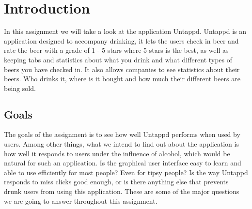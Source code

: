 \documentclass[12pt]{article}
\begin{document}
\clearpage

\setlength{\parskip}{0.2in}






\section{Introduction}


In this assignment we will take a look at the application Untappd. Untappd is an
application designed to accompany drinking, it lets the users check in beer and
rate the beer with a grade of 1 - 5 stars where 5 stars is the best, as well as
keeping tabs and statistics about what you drink and what different types of
beers you have checked in. It also allows companies to see statistics about
their beers. Who drinks it, where is it bought and how much their different
beers are being sold.

\subsection{Goals}

The goals of the assignment is to see how well Untappd performs when used by
users. Among other things, what we intend to find out about the application is
how well it responds to users under the influence of alcohol, which would be
natural for such an application. Is the graphical user interface easy to learn
and able to use efficiently for most people? Even for tipsy people? Is the way
Untappd responds to miss clicks good enough, or is there anything else that
prevents drunk users from using this application. These are some of the major
questions we are going to answer throughout this assignment.
\end{document}
